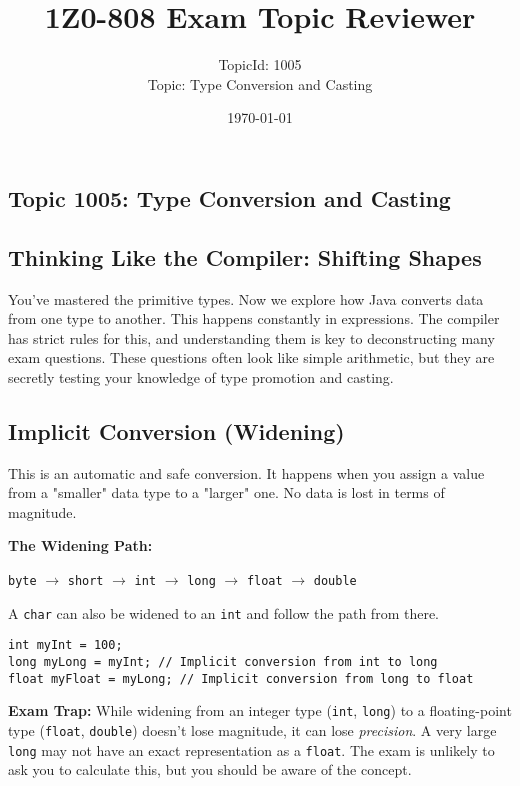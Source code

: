 \documentclass[12pt]{article}
\title{\textbf{1Z0-808 Exam Topic Reviewer}}
\author{TopicId: 1005 \\ Topic: Type Conversion and Casting}
\date{\today}
\begin{document}
\maketitle
\newpage\begin{enumerate}[label=(\arabic*)]
\section*{Topic 1005: Type Conversion and Casting}

\subsection*{Thinking Like the Compiler: Shifting Shapes}
You've mastered the primitive types. Now we explore how Java converts data from one type to another. This happens constantly in expressions. The compiler has strict rules for this, and understanding them is key to deconstructing many exam questions. These questions often look like simple arithmetic, but they are secretly testing your knowledge of type promotion and casting.

\subsection*{Implicit Conversion (Widening)}
This is an automatic and safe conversion. It happens when you assign a value from a "smaller" data type to a "larger" one. No data is lost in terms of magnitude.

\textbf{The Widening Path:}

\texttt{byte} $\rightarrow$ \texttt{short} $\rightarrow$ \texttt{int} $\rightarrow$ \texttt{long} $\rightarrow$ \texttt{float} $\rightarrow$ \texttt{double}

A \texttt{char} can also be widened to an \texttt{int} and follow the path from there.
\begin{verbatim}
int myInt = 100;
long myLong = myInt; // Implicit conversion from int to long
float myFloat = myLong; // Implicit conversion from long to float
\end{verbatim}

\textbf{Exam Trap:} While widening from an integer type (\texttt{int}, \texttt{long}) to a floating-point type (\texttt{float}, \texttt{double}) doesn't lose magnitude, it can lose \textit{precision}. A very large \texttt{long} may not have an exact representation as a \texttt{float}. The exam is unlikely to ask you to calculate this, but you should be aware of the concept.


\end{enumerate}
\end{document}
